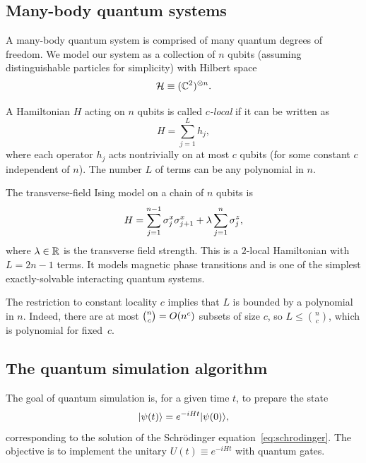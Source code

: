 \subsection{Many-body quantum systems}\label{subsec:many-body}

A many-body quantum system is comprised of many quantum degrees of freedom.
We model our system as a collection of $n$ qubits (assuming distinguishable
particles for simplicity) with Hilbert space
\begin{equation}
  \mathcal{H} \equiv (\mathbb{C}^2)^{\otimes n}.
\end{equation}

\begin{definition}\label{def:local-hamiltonian}
  A Hamiltonian $H$ acting on $n$ qubits is called \emph{$c$-local} if it
  can be written as
  \begin{equation}
    H = \sum_{j=1}^L h_j,
  \end{equation}
  where each operator $h_j$ acts nontrivially on at most $c$ qubits (for
  some constant $c$ independent of $n$).  The number $L$ of terms can be
  any polynomial in $n$.
\end{definition}

\begin{example}
  The transverse-field Ising model on a chain of $n$ qubits is
  \begin{equation}
    H = \sum_{j=1}^{n-1} \sigma^x_j\sigma^x_{j+1}
    + \lambda \sum_{j=1}^n \sigma^z_j,
  \end{equation}
  where $\lambda\in\mathbb{R}$ is the transverse field strength.  This is a
  $2$-local Hamiltonian with $L = 2n-1$ terms.  It models magnetic phase
  transitions and is one of the simplest exactly-solvable interacting
  quantum systems.
\end{example}

\begin{remark}
  The restriction to constant locality $c$ implies that $L$ is bounded
  by a polynomial in $n$.  Indeed, there are at most $\binom{n}{c} = O\!\left(n^c\right)$
  subsets of size $c$, so $L \le \binom{n}{c}$, which is polynomial for
  fixed~$c$.
\end{remark}


\subsection{The quantum simulation algorithm}\label{subsec:sim-algorithm}

The goal of quantum simulation is, for a given time $t$, to prepare the
state
\begin{equation}
  |\psi(t)\rangle = e^{-iHt}|\psi(0)\rangle,
\end{equation}
corresponding to the solution of the Schrödinger equation~\eqref{eq:schrodinger}.
The objective is to implement the unitary $U(t) \equiv e^{-iHt}$ with quantum gates.

